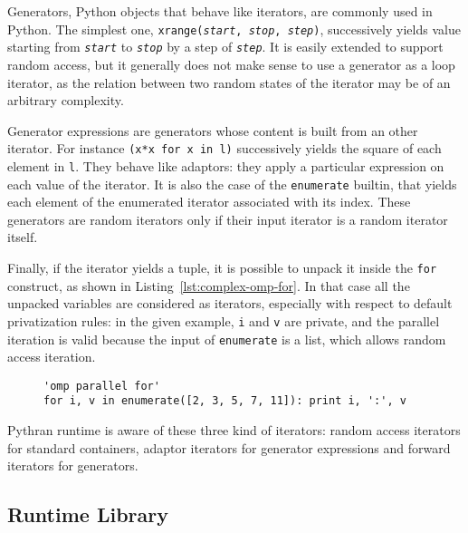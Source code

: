 \documentclass{llncs}
\begin{document}
Generators, Python objects that behave like iterators, are commonly used in
Python. The simplest one, \texttt{xrange(\emph{start}, \emph{stop},
\emph{step})}, successively yields value starting from \texttt{\emph{start}} to
\texttt{\emph{stop}} by a step of \texttt{\emph{step}}. It is easily extended to
support random access, but it generally does not make sense to use a generator
as a loop iterator, as the relation between two random states of the iterator
may be of an arbitrary complexity.

Generator expressions are generators whose content is built from an other
iterator. For instance \texttt{(x*x for x in l)} successively yields the square
of each element in \texttt{l}. They behave like adaptors: they apply a
particular expression on each value of the iterator. It is also the case of the
\texttt{enumerate} builtin, that yields each element of the enumerated iterator
associated with its index. These generators are random iterators only if their
input iterator is a random iterator itself.

Finally, if the iterator yields a tuple, it is possible to unpack it inside the
\texttt{for} construct, as shown in Listing~\ref{lst:complex-omp-for}. In that case
all the unpacked variables are considered as iterators, especially with respect
to default privatization rules: in the given example, \texttt{i} and \texttt{v}
are private, and the parallel iteration is valid because the input of
\texttt{enumerate} is a list, which allows random access iteration.

\begin{figure}
    \begin{lstlisting}[label={lst:complex-omp-for}, caption={Parallel
    loop in Pythran with tuple unpacking.}]
'omp parallel for'
for i, v in enumerate([2, 3, 5, 7, 11]): print i, ':', v
  \end{lstlisting}
\end{figure}

Pythran runtime is aware of these three kind of iterators: random access
iterators for standard containers, adaptor iterators for generator expressions
and forward iterators for generators.

\subsection{Runtime Library}
\end{document}
